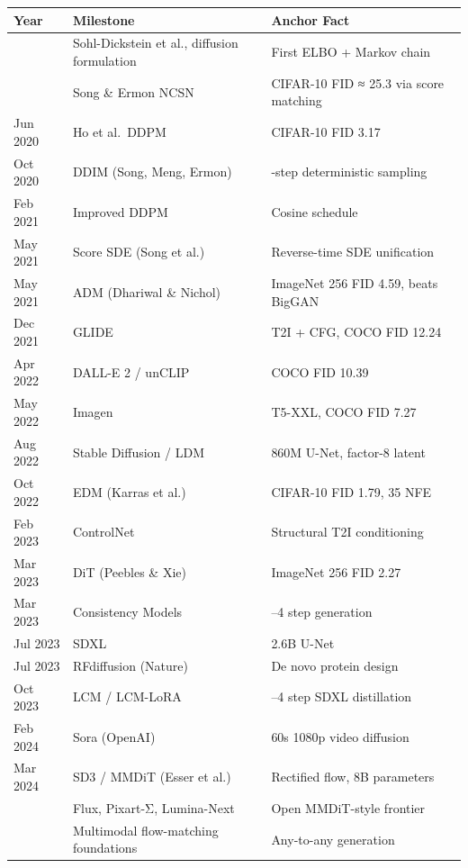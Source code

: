 {\def\LTcaptype{none} %
\begin{longtable}[]{@{}
  >{\raggedright\arraybackslash}p{}
  >{\raggedright\arraybackslash}p{}
  >{\raggedright\arraybackslash}p{}@{}}
\toprule\noalign{}
\begin{minipage}[b]{\linewidth}\raggedright
Year
\end{minipage} & \begin{minipage}[b]{\linewidth}\raggedright
Milestone
\end{minipage} & \begin{minipage}[b]{\linewidth}\raggedright
Anchor Fact
\end{minipage} \\
\midrule\noalign{}
\endhead
\bottomrule\noalign{}
\endlastfoot
2015 & Sohl-Dickstein et al., diffusion formulation & First ELBO + Markov chain \\
2019 & Song \& Ermon NCSN & CIFAR-10 FID ≈ 25.3 via score matching \\
Jun 2020 & Ho et al.~DDPM & CIFAR-10 FID 3.17 \\
Oct 2020 & DDIM (Song, Meng, Ermon) & 50-step deterministic sampling \\
Feb 2021 & Improved DDPM & Cosine schedule \\
May 2021 & Score SDE (Song et al.) & Reverse-time SDE unification \\
May 2021 & ADM (Dhariwal \& Nichol) & ImageNet 256 FID 4.59, beats BigGAN \\
Dec 2021 & GLIDE & T2I + CFG, COCO FID 12.24 \\
Apr 2022 & DALL-E 2 / unCLIP & COCO FID 10.39 \\
May 2022 & Imagen & T5-XXL, COCO FID 7.27 \\
Aug 2022 & Stable Diffusion / LDM & 860M U-Net, factor-8 latent \\
Oct 2022 & EDM (Karras et al.) & CIFAR-10 FID 1.79, 35 NFE \\
Feb 2023 & ControlNet & Structural T2I conditioning \\
Mar 2023 & DiT (Peebles \& Xie) & ImageNet 256 FID 2.27 \\
Mar 2023 & Consistency Models & 1--4 step generation \\
Jul 2023 & SDXL & 2.6B U-Net \\
Jul 2023 & RFdiffusion (Nature) & De novo protein design \\
Oct 2023 & LCM / LCM-LoRA & 2--4 step SDXL distillation \\
Feb 2024 & Sora (OpenAI) & 60s 1080p video diffusion \\
Mar 2024 & SD3 / MMDiT (Esser et al.) & Rectified flow, 8B parameters \\
2025 & Flux, Pixart-Σ, Lumina-Next & Open MMDiT-style frontier \\
2026 & Multimodal flow-matching foundations & Any-to-any generation \\
\end{longtable}
}

